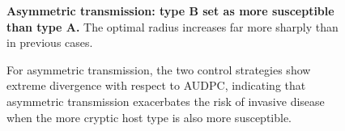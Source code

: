 \documentclass[11pt,letterpaper]{article}
\begin{document}
{%
% 
%

\begin{figure}[h]
	\centering

\caption{ \label{asym4000} \textbf{Asymmetric transmission: type B set as more susceptible than type A. } The optimal radius increases far more sharply than in previous cases.}

\end{figure}


\begin{figure}[h]
	\centering

\caption{ \label{asym4000compare} For asymmetric transmission, the two control strategies show extreme divergence with respect to AUDPC, indicating that asymmetric transmission exacerbates the risk of invasive disease when the more cryptic host type is also more susceptible. }

\end{figure}









}
\end{document}
